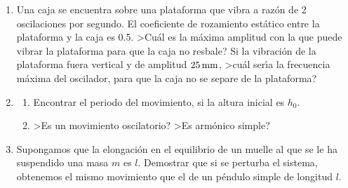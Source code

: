 \documentclass[12pt,twoside]{article}
\begin{document}

\begin{enumerate}

\item 
Una caja se encuentra sobre una plataforma que vibra a raz\'{o}n 
de 2 oscilaciones por segundo. El coeficiente de rozamiento
est\'{a}tico entre la plataforma y la caja es 0.5. >Cu\'{a}l
es la m\'{a}xima amplitud con la que puede vibrar la plataforma
para que la caja no resbale?
Si la vibraci\'{o}n de la plataforma fuera vertical y de amplitud 
$25\,{\rm mm}$, >cu\'{a}l ser\'{\i}a la frecuencia
m\'{a}xima del oscilador, para que la caja no se separe de la plataforma?



\item 
{}
\begin{enumerate}
\item Encontrar el periodo del movimiento, si la altura inicial es $h_0$.
\item >Es un movimiento oscilatorio? >Es arm\'{o}nico simple?
\end{enumerate}

\item 
Supongamos que la elongaci\'{o}n en el equilibrio 
de un muelle al que se le ha suspendido
una masa  $m$  es  $l$. Demostrar  que si se perturba el sistema,
obtenemos el mismo movimiento que el de un p\'{e}ndulo simple de longitud
$l$.



\end{enumerate}
\end{document}
